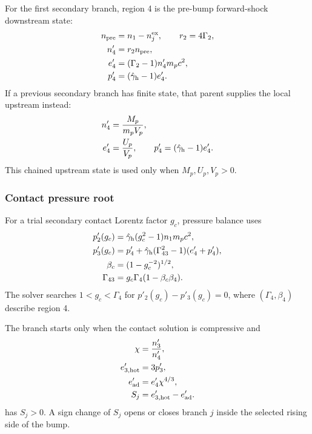 \documentclass[twocolumn]{aastex702}
\begin{document}
For the first secondary branch, region 4 is the pre-bump forward-shock downstream
state:
\begin{equation}
\begin{aligned}
n_{\rm pre}&=n_1-n_j^{\rm ex},\qquad r_2=4\Gamma_2,\\
n'_4&=r_2 n_{\rm pre},\\
e'_4&=(\Gamma_2-1)n'_4m_pc^2,\\
p'_4&=(\hat\gamma_{\rm h}-1)e'_4 .
\end{aligned}
\end{equation}
If a previous secondary branch has finite state, that parent supplies the local
upstream instead:
\begin{equation}
\begin{aligned}
n'_4&=\frac{M_p}{m_pV_p},\\
e'_4&=\frac{U_p}{V_p},\qquad
p'_4=(\hat\gamma_{\rm h}-1)e'_4 .
\end{aligned}
\end{equation}
This chained upstream state is used only when \(M_p,U_p,V_p>0\).

\subsubsection{Contact pressure root}

For a trial secondary contact Lorentz factor \(g_c\), pressure balance uses
\begin{equation}
\begin{aligned}
p'_2(g_c)&=
\hat\gamma_{\rm h}(g_c^2-1)n_1m_pc^2,\\
p'_3(g_c)&=
p'_4+\hat\gamma_{\rm h}(\Gamma_{43}^2-1)(e'_4+p'_4),\\
\beta_c&=(1-g_c^{-2})^{1/2},\\
\Gamma_{43}&=g_c\Gamma_4(1-\beta_c\beta_4).
\end{aligned}
\end{equation}
The solver searches \(1<g_c<\Gamma_4\) for \(p'_2(g_c)-p'_3(g_c)=0\), where
\((\Gamma_4,\beta_4)\) describe region 4.

The branch starts only when the contact solution is compressive and
\begin{equation}
\begin{aligned}
\chi&=\frac{n'_3}{n'_4},\\
e'_{3,{\rm hot}}&=3p'_3,\\
e'_{\rm ad}&=e'_4\chi^{4/3},\\
S_j&=e'_{3,{\rm hot}}-e'_{\rm ad}.
\end{aligned}
\end{equation}
has \(S_j>0\).  A sign change of \(S_j\) opens or closes branch \(j\) inside the
selected rising side of the bump.
\end{document}
